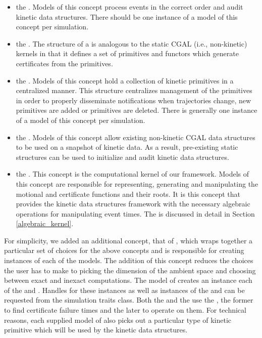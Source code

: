 \begin{itemize}

\item the . Models of this concept process events in
  the correct order and audit kinetic data structures. There should be
  one instance of a model of this concept per simulation.
\item the . The structure of a
   is analogous to the static CGAL (i.e.,
  non-kinetic) kernels in that it defines a set of primitives and
  functors which generate certificates from the primitives.
\item the . Models of this concept hold a
  collection of kinetic primitives in a centralized manner. This
  structure centralizes management of the primitives in order to
  properly disseminate notifications when trajectories change, new
  primitives are added or primitives are deleted.
  There is generally one instance of a model of this concept per simulation.
\item the . Models of this concept allow
  existing non-kinetic CGAL data structures to be used on a snapshot
  of kinetic data. As a result, pre-existing static structures can be
  used to initialize and audit kinetic data structures.
\item the . This concept is the computational
  kernel of our framework.  Models of this concept are responsible for
  representing, generating and manipulating the motional and
  certificate functions and their roots. It is this concept that
  provides the kinetic data structures framework with the necessary
  algebraic operations for manipulating event times. The
   is discussed in detail in Section
  \ref{algebraic_kernel}.
\end{itemize}

For simplicity, we added an additional concept, that of
, which wraps together a particular set of
choices for the above concepts and is responsible for creating
instances of each of the models. The addition of this concept reduces
the choices the user has to make to picking the dimension of the
ambient space and choosing between exact and inexact computations. The
model of  creates an instance each of the
 and . Handles for
these instances as well as instances of the 
and  can be requested from the simulation
traits class. Both the  and the
 use the , the former to find
certificate failure times and the later to operate on them. For
technical reasons, each supplied model of  also
picks out a particular type of kinetic primitive which will be used by
the kinetic data structures.



